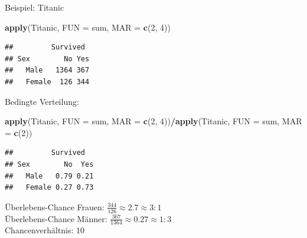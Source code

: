 \documentclass[
  10pt,
  ignorenonframetext,
]{beamer}
\newenvironment{Shaded}{\begin{snugshade}}{\end{snugshade}}
\newcommand{\AttributeTok}[1]{\textcolor[rgb]{0.13,0.29,0.53}{#1}}
\newcommand{\DecValTok}[1]{\textcolor[rgb]{0.00,0.00,0.81}{#1}}
\newcommand{\FunctionTok}[1]{\textcolor[rgb]{0.13,0.29,0.53}{\textbf{#1}}}
\newcommand{\NormalTok}[1]{#1}
\newcommand{\SpecialCharTok}[1]{\textcolor[rgb]{0.81,0.36,0.00}{\textbf{#1}}}
\begin{document}
\begin{frame}[fragile]{Beispiel: Titanic}
\protect\hypertarget{beispiel-titanic-2}{}
\scriptsize

\begin{Shaded}
\begin{Highlighting}[]
\FunctionTok{apply}\NormalTok{(Titanic, }\AttributeTok{FUN =}\NormalTok{ sum, }\AttributeTok{MAR =} \FunctionTok{c}\NormalTok{(}\DecValTok{2}\NormalTok{, }\DecValTok{4}\NormalTok{))}
\end{Highlighting}
\end{Shaded}

\begin{verbatim}
##         Survived
## Sex        No Yes
##   Male   1364 367
##   Female  126 344
\end{verbatim}

\normalsize

Bedingte Verteilung: \scriptsize

\begin{Shaded}
\begin{Highlighting}[]
\FunctionTok{apply}\NormalTok{(Titanic, }\AttributeTok{FUN =}\NormalTok{ sum, }\AttributeTok{MAR =} \FunctionTok{c}\NormalTok{(}\DecValTok{2}\NormalTok{, }\DecValTok{4}\NormalTok{))}\SpecialCharTok{/}\FunctionTok{apply}\NormalTok{(Titanic, }\AttributeTok{FUN =}\NormalTok{ sum, }\AttributeTok{MAR =} \FunctionTok{c}\NormalTok{(}\DecValTok{2}\NormalTok{))}
\end{Highlighting}
\end{Shaded}

\begin{verbatim}
##         Survived
## Sex        No  Yes
##   Male   0.79 0.21
##   Female 0.27 0.73
\end{verbatim}

\normalsize

Überlebens-Chance Frauen: \(\frac{344}{126} \approx 2.7 \approx 3:1\)\\
Überlebens-Chance Männer:
\(\frac{367}{1364} \approx 0.27 \approx 1:3\)\\
Chancenverhältnis: \(10\)

\end{frame}
\end{document}
